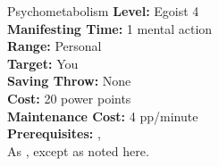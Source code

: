 {Psychometabolism}
{
	\textbf{Level:}
	Egoist 4\\
	\textbf{Manifesting Time:}
	1 mental action\\
	\textbf{Range:}
	Personal\\
	\textbf{Target:}
	You\\
	\textbf{Saving Throw:}
	None\\
	\textbf{Cost:}
	20 power points\\
	\textbf{Maintenance Cost:}
	4 pp/minute\\
	\textbf{Prerequisites:}
	, \\
}
{
	As , except as noted here.
}